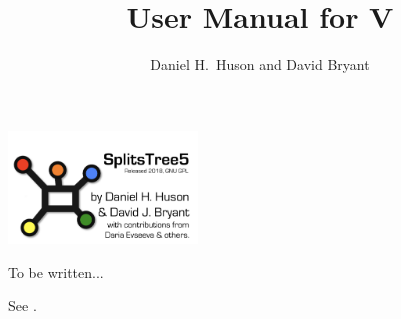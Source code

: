 \documentclass[11pt]{article}
\title{User Manual for \SplitsTree V\VERSION}
\author{Daniel H.~Huson and David Bryant}
\begin{document}

\maketitle

\begin{center}
\includegraphics[height=3cm]{../../src/splitstree5/resources/images/Splitstree5-splash.png}
\end{center}

\tableofcontents

To be written...

See \cite{HusonBryant2006}.





\printindex
\end{document}
